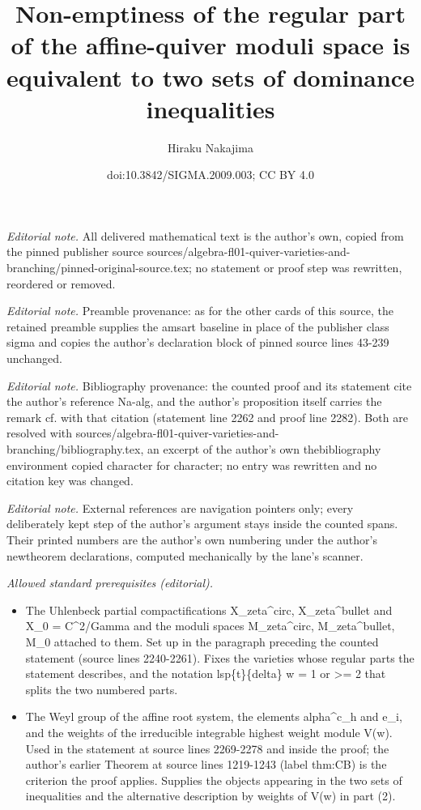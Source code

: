 \documentclass[10pt,a4paper]{amsart}
\title{Non-emptiness of the regular part of the affine-quiver moduli space is equivalent to two sets of dominance inequalities}
\author{Hiraku Nakajima}
\date{doi:10.3842/SIGMA.2009.003; CC BY 4.0}
\theoremstyle{definition}
\numberwithin{equation}{section}
\begin{document}
\maketitle
\noindent\textit{Editorial note.} All delivered mathematical text is the author's own, copied from the pinned publisher source sources/algebra-fl01-quiver-varieties-and-branching/pinned-original-source.tex; no statement or proof step was rewritten, reordered or removed.\par\medskip
\noindent\textit{Editorial note.} Preamble provenance: as for the other cards of this source, the retained preamble supplies the amsart baseline in place of the publisher class sigma and copies the author's declaration block of pinned source lines 43-239 unchanged.\par\medskip
\noindent\textit{Editorial note.} Bibliography provenance: the counted proof and its statement cite the author's reference Na-alg, and the author's proposition itself carries the remark cf. with that citation (statement line 2262 and proof line 2282). Both are resolved with sources/algebra-fl01-quiver-varieties-and-branching/bibliography.tex, an excerpt of the author's own thebibliography environment copied character for character; no entry was rewritten and no citation key was changed.\par\medskip
\noindent\textit{Editorial note.} External references are navigation pointers only; every deliberately kept step of the author's argument stays inside the counted spans. Their printed numbers are the author's own numbering under the author's newtheorem declarations, computed mechanically by the lane's scanner.\par\medskip
\noindent\textit{Allowed standard prerequisites (editorial).}\begin{itemize}
\item The Uhlenbeck partial compactifications X\_zeta\textasciicircum{}circ, X\_zeta\textasciicircum{}bullet and X\_0 = C\textasciicircum{}2/Gamma and the moduli spaces M\_zeta\textasciicircum{}circ, M\_zeta\textasciicircum{}bullet, M\_0 attached to them. Set up in the paragraph preceding the counted statement (source lines 2240-2261). Fixes the varieties whose regular parts the statement describes, and the notation lsp\{t\}\{delta\} w = 1 or >= 2 that splits the two numbered parts.
\item The Weyl group of the affine root system, the elements alpha\textasciicircum{}c\_h and e\_i, and the weights of the irreducible integrable highest weight module V(w). Used in the statement at source lines 2269-2278 and inside the proof; the author's earlier Theorem at source lines 1219-1243 (label thm:CB) is the criterion the proof applies. Supplies the objects appearing in the two sets of inequalities and the alternative description by weights of V(w) in part (2).
\end{itemize}\medskip
\end{document}
